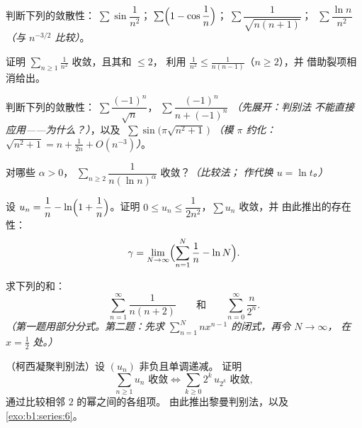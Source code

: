 \begin{exercise}[$\star$]\label{exo:b1:series:3}
判断下列的敛散性：$\;\sum \sin\dfrac{1}{n^2}$；$\;\sum
\Bigl(1 - \cos\dfrac1n\Bigr)$；$\;\sum \dfrac{1}{\sqrt{n(n+1)}}$；
$\;\sum \dfrac{\ln n}{n^2}$ \emph{（与 $n^{-3/2}$ 比较）}。
\end{exercise}

\begin{exercise}[$\star$]\label{exo:b1:series:4}
证明 $\sum_{n\geq1} \frac{1}{n^2}$ 收敛，且其和 $\leq 2$，
利用 $\frac{1}{n^2} \leq \frac{1}{n(n-1)}$（$n \geq 2$），并
借助裂项相消给出。
\end{exercise}

\begin{exercise}[$\star\star$]\label{exo:b1:series:5}
判断下列的敛散性：$\;\sum \dfrac{(-1)^n}{\sqrt n}$，$\;\sum
\dfrac{(-1)^n}{n + (-1)^n}$ \emph{（先展开：判别法
不能直接应用——为什么？）}，以及 $\;\sum
\sin\bigl(\pi\sqrt{n^2+1}\,\bigr)$ \emph{（模 $\pi$ 约化：
$\sqrt{n^2+1} = n + \frac{1}{2n} + O(n^{-3})$）}。
\end{exercise}

\begin{exercise}[$\star\star$]\label{exo:b1:series:6}
对哪些 $\alpha > 0$， $\sum_{n \geq 2}
\dfrac{1}{n (\ln n)^{\alpha}}$ 收敛？\emph{（比较法；
作代换 $u = \ln t$。）}
\end{exercise}

\begin{exercise}[$\star\star$]\label{exo:b1:series:7}
设 $u_n = \dfrac{1}{n} - \ln\Bigl(1 + \dfrac1n\Bigr)$。证明
$0 \leq u_n \leq \dfrac{1}{2n^2}$，$\sum u_n$ 收敛，并
由此推出的存在性：
\[
\gamma = \lim_{N \to \infty} \Bigl( \sum_{n=1}^{N} \frac 1n - \ln N
\Bigr) .
\]
\end{exercise}

\begin{exercise}[$\star\star$]\label{exo:b1:series:8}
求下列的和：
\[
\sum_{n=1}^{\infty} \frac{1}{n(n+2)}
\qquad\text{和}\qquad
\sum_{n=0}^{\infty} \frac{n}{2^n} .
\]
\emph{（第一题用部分分式。第二题：先求
$\sum_{n=1}^{N} n x^{n-1}$ 的闭式，再令 $N \to \infty$，
在 $x = \frac12$ 处。）}
\end{exercise}

\begin{exercise}[$\star\star\star$]\label{exo:b1:series:9}
（柯西凝聚判别法）设 $(u_n)$ 非负且单调递减。
证明
\[
\sum_{n \geq 1} u_n \text{ 收敛}
\iff
\sum_{k \geq 0} 2^k\, u_{2^k} \text{ 收敛},
\]
通过比较相邻 $2$ 的幂之间的各组项。
由此推出黎曼判别法，以及
\cref{exo:b1:series:6}。
\end{exercise}


